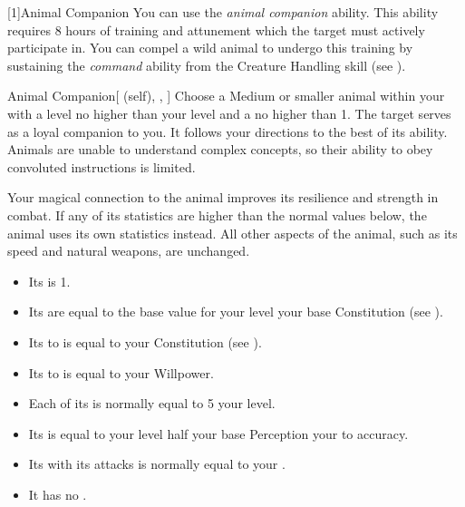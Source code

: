         [1]{Animal Companion}
        You can use the \textit{animal companion} ability.
        This ability requires 8 hours of training and attunement which the target must actively participate in.
        You can compel a wild animal to undergo this training by sustaining the \textit{command} ability from the Creature Handling skill (see ).
        \begin{attuneability}{Animal Companion}[ (self), , ]
            Choose a Medium or smaller animal  within your  with a level no higher than your level and a  no higher than 1.
            The target serves as a loyal companion to you.
            It follows your directions to the best of its ability.
            Animals are unable to understand complex concepts, so their ability to obey convoluted instructions is limited.

            Your magical connection to the animal improves its resilience and strength in combat.
            If any of its statistics are higher than the normal values below, the animal uses its own statistics instead.
            All other aspects of the animal, such as its speed and natural weapons, are unchanged.
            \begin{itemize}
                \item Its  is 1.
                \item Its  are equal to the base value for your level \add your base Constitution (see ).
                \item Its  to  is equal to your Constitution (see ).
                \item Its  to  is equal to your Willpower.
                \item Each of its  is normally equal to 5 \add your level.
                \item Its  is equal to your level \add half your base Perception \add your  to accuracy.
                \item Its  with its attacks is normally equal to your  .
                \item It has no .
            \end{itemize}
        \end{attuneability}

